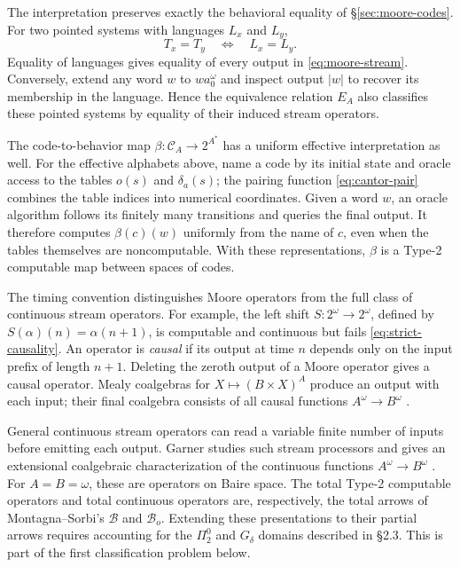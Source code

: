 \documentclass[11pt]{article}
\theoremstyle{definition}
\begin{document}
The interpretation preserves exactly the behavioral equality of
\S\ref{sec:moore-codes}. For two pointed systems with languages
$L_x$ and $L_y$,
\begin{equation}\label{eq:moore-operator-equality}
 T_x=T_y\quad\Longleftrightarrow\quad L_x=L_y.
\end{equation}
Equality of languages gives equality of every output in
\eqref{eq:moore-stream}. Conversely, extend any word $w$ to
$wa_0^\omega$ and inspect output $|w|$ to recover its membership
in the language. Hence the equivalence relation $E_A$ also classifies
these pointed systems by equality of their induced stream operators.

The code-to-behavior map $\beta:\mathcal C_A\to2^{A^*}$ has a
uniform effective interpretation as well. For the effective alphabets
above, name a code by its initial state and oracle access to the
tables $o(s)$ and $\delta_a(s)$; the pairing function
\eqref{eq:cantor-pair} combines the table indices into numerical
coordinates. Given a word $w$, an oracle algorithm follows its
finitely many transitions and queries the final output. It therefore
computes $\beta(c)(w)$ uniformly from the name of $c$, even when
the tables themselves are noncomputable. With these representations,
$\beta$ is a Type-2 computable map between spaces of codes.

The timing convention distinguishes Moore operators from the full
class of continuous stream operators. For example, the left shift
$S:2^\omega\to2^\omega$, defined by $S(\alpha)(n)=\alpha(n+1)$,
is computable and continuous but fails \eqref{eq:strict-causality}.
An operator is \emph{causal} if its output at time $n$ depends only
on the input prefix of length $n+1$. Deleting the zeroth output of
a Moore operator gives a causal operator. Mealy coalgebras for
$X\mapsto(B\times X)^A$ produce an output with each input;
their final coalgebra consists of all causal functions
$A^\omega\to B^\omega$ \cite[Section 2.2, Theorem 2.3]{Mealy}.

General continuous stream operators can read a variable finite
number of inputs before emitting each output. Garner studies such
stream processors and gives an extensional coalgebraic
characterization of the continuous functions
$A^\omega\to B^\omega$ \cite[Theorem 1.1]{Garner}. For
$A=B=\omega$, these are operators on Baire space. The total
Type-2 computable operators and total continuous operators are,
respectively, the total arrows of Montagna--Sorbi's $\mathcal B$
and $\mathcal B_o$. Extending these presentations to their partial
arrows requires accounting for the $\Pi^0_2$ and $G_\delta$
domains described in \S2.3. This is part of the first classification
problem below.
\end{document}
